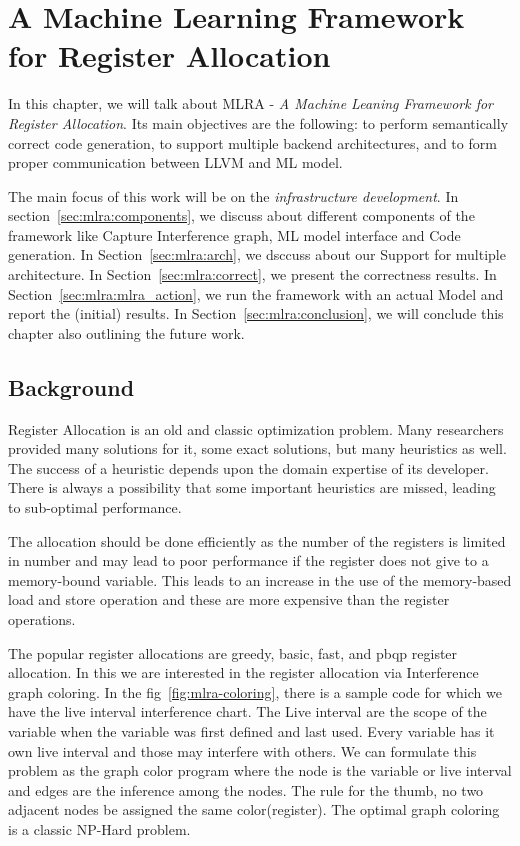\chapter{A Machine Learning Framework for Register Allocation}
\label{chap:ch5}

In this chapter, we will talk about MLRA - \textit{A Machine Leaning Framework for Register Allocation}. Its main objectives are the following: to perform semantically correct code generation,  to support multiple backend architectures, 
and to form proper communication between LLVM and ML model. 

The main focus of this work will be on the \textit{infrastructure development}. 
In section~\ref{sec:mlra:components}, we discuss about different components of the framework like Capture Interference graph, ML model interface and Code generation. 
In Section~\ref{sec:mlra:arch}, we dsccuss about our Support for multiple architecture. 
In Section~\ref{sec:mlra:correct}, we present the correctness results.
In Section~\ref{sec:mlra:mlra_action}, we run the framework with an actual Model and report the (initial) results. 
In Section~\ref{sec:mlra:conclusion}, we will conclude this chapter also outlining the future work.



\section{Background}\label{sec:mlra:bg}
Register Allocation is an old and classic optimization problem. Many researchers provided many solutions for it, some exact solutions, but many heuristics as well. The success of a heuristic  depends upon the domain expertise of its developer. There is always a possibility that some important heuristics are missed, leading to sub-optimal performance.

The allocation should be done efficiently as the number of the registers is limited in number and may lead to poor performance if the register does not give to a memory-bound variable. This leads to an increase in the use of the memory-based load and store operation and these are more expensive than the register operations. 

The popular register allocations are greedy, basic, fast, and pbqp register allocation. In this we are interested in the register allocation via Interference graph coloring. In the fig~\ref{fig:mlra-coloring}, there is a sample code for which we have the live interval interference chart. The Live interval are the scope of the variable when the variable was first defined and last used. Every variable has it own live interval and those may interfere with others. We can formulate this problem as the graph color program where the node is the variable or live interval and edges are the inference among the nodes. The rule for the thumb, no two adjacent nodes be assigned the same color(register). The optimal graph coloring is a classic NP-Hard problem. 

